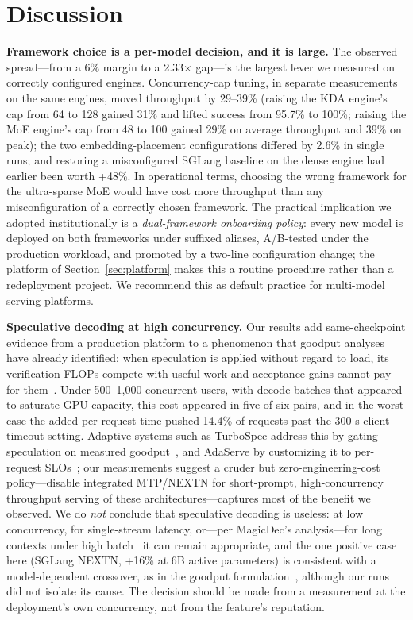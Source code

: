 \documentclass[11pt]{article}
\begin{document}
\section{Discussion}

\textbf{Framework choice is a per-model decision, and it is large.} The observed spread---from a 6\% margin to a 2.33$\times$ gap---is the largest lever we measured on correctly configured engines. Concurrency-cap tuning, in separate measurements on the same engines, moved throughput by 29--39\% (raising the KDA engine's cap from 64 to 128 gained 31\% and lifted success from 95.7\% to 100\%; raising the MoE engine's cap from 48 to 100 gained 29\% on average throughput and 39\% on peak); the two embedding-placement configurations differed by 2.6\% in single runs; and restoring a misconfigured SGLang baseline on the dense engine had earlier been worth +48\%. In operational terms, choosing the wrong framework for the ultra-sparse MoE would have cost more throughput than any misconfiguration of a correctly chosen framework. The practical implication we adopted institutionally is a \emph{dual-framework onboarding policy}: every new model is deployed on both frameworks under suffixed aliases, A/B-tested under the production workload, and promoted by a two-line configuration change; the platform of Section~\ref{sec:platform} makes this a routine procedure rather than a redeployment project. We recommend this as default practice for multi-model serving platforms.

\textbf{Speculative decoding at high concurrency.} Our results add same-checkpoint evidence from a production platform to a phenomenon that goodput analyses have already identified: when speculation is applied without regard to load, its verification FLOPs compete with useful work and acceptance gains cannot pay for them~\cite{liu2024turbospec}. Under 500--1,000 concurrent users, with decode batches that appeared to saturate GPU capacity, this cost appeared in five of six pairs, and in the worst case the added per-request time pushed 14.4\% of requests past the 300 s client timeout setting. Adaptive systems such as TurboSpec address this by gating speculation on measured goodput~\cite{liu2024turbospec}, and AdaServe by customizing it to per-request SLOs~\cite{li2025adaserve}; our measurements suggest a cruder but zero-engineering-cost policy---disable integrated MTP/NEXTN for short-prompt, high-concurrency throughput serving of these architectures---captures most of the benefit we observed. We do \emph{not} conclude that speculative decoding is useless: at low concurrency, for single-stream latency, or---per MagicDec's analysis---for long contexts under high batch~\cite{sadhukhan2024magicdec} it can remain appropriate, and the one positive case here (SGLang NEXTN, +16\% at 6B active parameters) is consistent with a model-dependent crossover, as in the goodput formulation~\cite{liu2024turbospec}, although our runs did not isolate its cause. The decision should be made from a measurement at the deployment's own concurrency, not from the feature's reputation.
\end{document}
